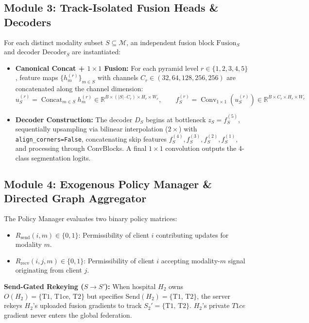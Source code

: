 \documentclass[10pt,a4paper]{article}
\begin{document}
\subsection{Module 3: Track-Isolated Fusion Heads \& Decoders}
For each distinct modality subset $S \subseteq \mathcal{M}$, an independent fusion block $\text{Fusion}_S$ and decoder $\text{Decoder}_S$ are instantiated:
\begin{itemize}[itemsep=1pt, topsep=1pt]
    \item \textbf{Canonical Concat + $1\times 1$ Fusion:} For each pyramid level $r \in \{1, 2, 3, 4, 5\}$, feature maps $\{h_m^{(r)}\}_{m \in S}$ with channels $C_r \in (32, 64, 128, 256, 256)$ are concatenated along the channel dimension:
    \begin{equation}
        u_S^{(r)} = \operatorname{Concat}_{m \in S} h_m^{(r)} \in \mathbb{R}^{B \times (|S| \cdot C_r) \times H_r \times W_r}, \qquad f_S^{(r)} = \operatorname{Conv}_{1\times 1}(u_S^{(r)}) \in \mathbb{R}^{B \times C_r \times H_r \times W_r}
    \end{equation}
    \item \textbf{Decoder Construction:} The decoder $D_S$ begins at bottleneck $z_S = f_S^{(5)}$, sequentially upsampling via bilinear interpolation ($2\times$) with \texttt{align\_corners=False}, concatenating skip features $f_S^{(4)}, f_S^{(3)}, f_S^{(2)}, f_S^{(1)}$, and processing through ConvBlocks. A final $1\times 1$ convolution outputs the 4-class segmentation logits.
\end{itemize}

\subsection{Module 4: Exogenous Policy Manager \& Directed Graph Aggregator}
The Policy Manager evaluates two binary policy matrices:
\begin{itemize}[itemsep=1pt, topsep=1pt]
    \item $R_{\text{send}}(i, m) \in \{0, 1\}$: Permissibility of client $i$ contributing updates for modality $m$.
    \item $R_{\text{recv}}(i, j, m) \in \{0, 1\}$: Permissibility of client $i$ accepting modality-$m$ signal originating from client $j$.
\end{itemize}
\noindent \textbf{Send-Gated Rekeying ($S \to S'$):} When hospital $H_2$ owns $O(H_2) = \{\text{T1, T1ce, T2}\}$ but specifies $\text{Send}(H_2) = \{\text{T1, T2}\}$, the server rekeys $H_2$'s uploaded fusion gradients to track $S_2' = \{\text{T1, T2}\}$. $H_2$'s private $T1ce$ gradient never enters the global federation.
\end{document}

